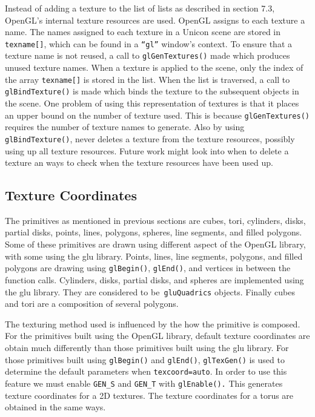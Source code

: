 Instead of adding a texture to the list of lists as described in
section 7.3, OpenGL's internal texture resources are used. OpenGL
assigns to each texture a name. The names assigned to each texture in
a Unicon scene are stored in \texttt{texname[]}, which can be found in
a \texttt{``gl''} window's context. To ensure that a texture name is
not reused, a call to \texttt{glGenTextures()} made which produces
unused texture names. When a texture is applied to the scene, only the
index of the array \texttt{texname[]} is stored in the list. When the
list is traversed, a call to \texttt{glBindTexture()} is made which
binds the texture to the subsequent objects in the scene. One problem
of using this representation of textures is that it places an upper
bound on the number of texture used. This is because
\texttt{glGenTextures()} requires the number of texture names to
generate. Also by using \texttt{glBindTexture()}, never deletes a
texture from the texture resources, possibly using up all texture
resources. Future work might look into when to delete a texture an
ways to check when the texture resources have been used up.

\subsection{Texture Coordinates}

The primitives as mentioned in previous sections are cubes, tori,
cylinders, disks, partial disks, points, lines, polygons, spheres,
line segments, and filled polygons. Some of these primitives are drawn
using different aspect of the OpenGL library, with some using the glu
library. Points, lines, line segments, polygons, and filled polygons
are drawing using \texttt{glBegin()}, \texttt{glEnd()}, and vertices
in between the function calls. Cylinders, disks, partial disks, and
spheres are implemented using the glu library. They are considered to
be\texttt{ gluQuadrics} objects. Finally cubes and tori are a
composition of several polygons.

The texturing method used is influenced by the how the primitive is
composed. For the primitives built using the OpenGL library, default
texture coordinates are obtain much differently than those primitives
built using the glu library. For those primitives built using
\texttt{glBegin()} and \texttt{glEnd()}, \texttt{glTexGen()} is used
to determine the default parameters when
\texttt{{\textquotedbl}texcoord=auto{\textquotedbl}}. In order to use
this feature we must enable \texttt{GEN\_S} and \texttt{GEN\_T} with
\texttt{glEnable().} This generates texture coordinates for a 2D
textures. The texture coordinates for a torus are obtained in the same
ways.

